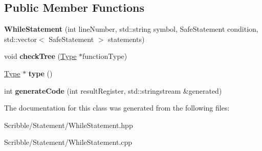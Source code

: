 \subsection*{Public Member Functions}
\begin{DoxyCompactItemize}
\item 
\hypertarget{class_while_statement_a99cb8547c675fc93fc954ec02c68871b}{{\bfseries While\-Statement} (int line\-Number, std\-::string symbol, Safe\-Statement condition, std\-::vector$<$ Safe\-Statement $>$ statements)}\label{class_while_statement_a99cb8547c675fc93fc954ec02c68871b}

\item 
\hypertarget{class_while_statement_a094f98a3580f89d076013f0068457d63}{void {\bfseries check\-Tree} (\hyperlink{class_type}{Type} $\ast$function\-Type)}\label{class_while_statement_a094f98a3580f89d076013f0068457d63}

\item 
\hypertarget{class_while_statement_aa73e638ca8d2e2363123aa0ba8fe8502}{\hyperlink{class_type}{Type} $\ast$ {\bfseries type} ()}\label{class_while_statement_aa73e638ca8d2e2363123aa0ba8fe8502}

\item 
\hypertarget{class_while_statement_a3441f8332509d7dacfcfe191d0567f5a}{int {\bfseries generate\-Code} (int result\-Register, std\-::stringstream \&generated)}\label{class_while_statement_a3441f8332509d7dacfcfe191d0567f5a}

\end{DoxyCompactItemize}


The documentation for this class was generated from the following files\-:\begin{DoxyCompactItemize}
\item 
Scribble/\-Statement/While\-Statement.\-hpp\item 
Scribble/\-Statement/While\-Statement.\-cpp\end{DoxyCompactItemize}
